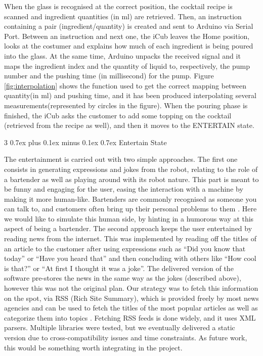 \documentclass[conference]{IEEEtran}
\makeatletter
\def\subsubsection{\@startsection{subsubsection}%
	{3}%
	{\z@}%
	{0.7ex plus 0.1ex minus 0.1ex}%
	{0.7ex}%
	{\normalfont\normalsize\itshape}}%
\makeatother
\begin{document}
When the glass is recognised at the correct position, the cocktail recipe is scanned and ingredient quantities (in ml) are retrieved. Then, an instruction containing a pair (ingredient/quantity) is created and sent to Arduino via Serial Port. Between an instruction and next one, the iCub leaves the Home position, looks at the costumer and explains how much of each ingredient is being poured into the glass. At the same time, Arduino unpacks the received signal and it maps the ingredient index and the quantity of liquid to, respectively, the pump number and the pushing time (in millisecond) for the pump. Figure \ref{fig:interpolation} shows the function used to get the correct mapping between quantity(in ml) and pushing time, and it has been produced interpolating several measurements(represented by circles in the figure). When the pouring phase is finished, the iCub asks the customer to add some topping on the cocktail (retrieved from the recipe as well), and then it moves to the ENTERTAIN state. 

\subsubsection{Entertain State}

The entertainment is carried out with two simple approaches. The first one consists in generating expressions and jokes from the robot, relating to the role of a bartender as well as playing around with its robot nature. This part is meant to be funny and engaging for the user, easing the interaction with a machine by making it more human-like. Bartenders are commonly recognised as someone you can talk to, and customers often bring up their personal problems to them \cite{bartenderPsy}. Here we would like to simulate this human side, by hinting in a humorous way at this aspect of being a bartender.
The second approach keeps the user entertained by reading news from the internet. This was implemented by reading off the titles of an article to the customer after using expressions such as ``Did you know that today'' or ``Have you heard that'' and then concluding with others like ``How cool is that?'' or ``At first I thought it was a joke''. The delivered version of the software pre-stores the news in the same way as the jokes (described above), however this was not the original plan. Our strategy was to fetch this information on the spot, via RSS (Rich Site Summary), which is provided freely by most news agencies and can be used to fetch the titles of the most popular articles as well as categorize them into topics \cite{bbcRss}. Fetching RSS feeds is done widely, and it uses XML parsers. Multiple libraries were tested, but we eventually delivered a static version due to cross-compatibility issues and time constraints. As future work, this would be something worth integrating in the project. 
\end{document}
